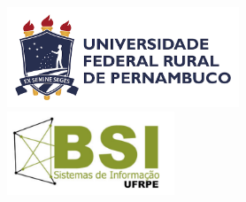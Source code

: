 \documentclass[
	openany,
	12pt,%
    oneside,
	a4paper,			%
	brazil				%
	]{abntex2}
\begin{document}

\frenchspacing 



	\begin{figure}[ht]
		\includegraphics[height=3cm]{figuras/logo_ufrpe_horizontal.png}
		\hspace{4.5cm}
    	\includegraphics[height=2.5cm]{figuras/logo_bsi.pdf}
	\end{figure}    

\imprimircapa
\imprimirfolhaderosto


\end{document}

